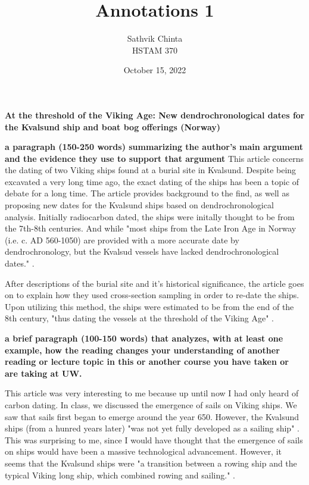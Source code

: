 \documentclass[a4paper]{article}
\title {
	Annotations 1
}
\author {
	\normalsize Sathvik Chinta\\\normalsize
    \normalsize HSTAM 370\\\normalsize
}
\date {
	\color{black} October 15, 2022
}
\begin{document}
 \maketitle
    \section{}
        \textbf{At the threshold of the Viking Age: New dendrochronological dates for the Kvalsund ship and boat bog offerings (Norway)}

        \textbf{a paragraph (150-250 words) summarizing the author's main argument and the evidence they use to support that argument}
        This article concerns the dating of two Viking ships found at a burial site in Kvalsund.
        Despite being excavated a very long time ago, the exact dating of the ships has been a topic of 
        debate for a long time. The article provides background to the find, as well as proposing new dates for the 
        Kvalsund ships based on dendrochronological analysis. Initially radiocarbon dated, the ships 
        were initally thought to be from the 7th-8th centuries. And while "most ships from the Late Iron 
        Age in Norway (i.e. c. AD 560-1050) are provided with a more accurate date by 
        dendrochronology, but the Kvalsud vessels have lacked dendrochronological dates." \citep{NORDEIDE2020102192}. 

        After descriptions of the burial site and it's historical significance, the article goes on to explain how they used 
        cross-section sampling in order to re-date the ships. Upon utilizing this method, the 
        ships were estimated to be from the end of the 8th century, "thus dating the vessels at the threshold of the Viking Age"
        \citep{NORDEIDE2020102192}.
        
        \textbf{a brief paragraph (100-150 words) that analyzes, with at least one example, how the reading changes your understanding of another reading or lecture topic in this or another course you have taken or are taking at UW.}
        
        This article was very interesting to me because up until now I had only heard of carbon dating. In class, we 
        discussed the emergence of sails on Viking ships. We saw that sails first began to emerge around the year
        650. However, the Kvalsund ships (from a hunred years later) "was not yet fully developed as a sailing ship" \citep{NORDEIDE2020102192}.
        This was surprising to me, since I would have thought that the emergence of sails on ships would have been a massive
        technological advancement. However, it seems that the Kvalsund ships were "a transition between a rowing ship and the typical Viking long ship, which combined rowing and sailing." \citep{NORDEIDE2020102192}.

        \pagebreak
        
        
        \cite{NORDEIDE2020102192}
\end{document}

